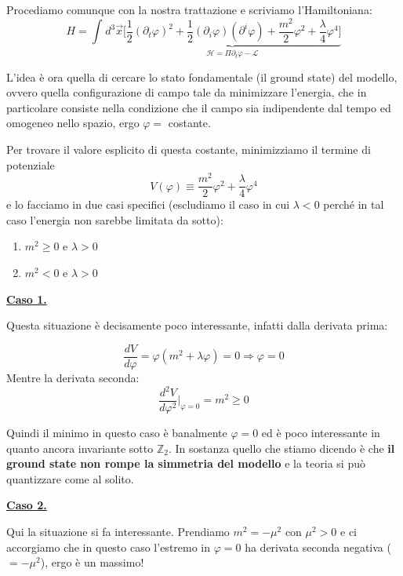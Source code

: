 \documentclass[../main.tex]{subfiles}
\begin{document}
Procediamo comunque con la nostra trattazione e scriviamo l'Hamiltoniana:
\[
H = \int_{}d^3\Vec{x}\underbrace{\bigg[ \frac{1}{2}(\partial_t\varphi)^2 + \frac{1}{2}(\partial_i\varphi)(\partial^i\varphi) + \frac{m^2}{2}\varphi^2  + \frac{\lambda}{4}\varphi^4\bigg]}_{\mathscr{H} = \Pi\partial_t\varphi - \mathscr{L}}
\]

L'idea è ora quella di cercare lo stato fondamentale (il ground state) del modello, ovvero quella configurazione di campo tale da minimizzare l'energia, che in particolare consiste nella condizione che il campo sia indipendente dal tempo ed omogeneo nello spazio, ergo $\varphi = $ costante.

Per trovare il valore esplicito di questa costante, minimizziamo il termine di potenziale
\[
V(\varphi) \equiv \frac{m^2}{2}\varphi^2  + \frac{\lambda}{4}\varphi^4
\]
e lo facciamo in due casi specifici (escludiamo il caso in cui $\lambda<0$ perché in tal caso l'energia non sarebbe limitata da sotto):
\begin{enumerate}
    \item $m^2\geq0$ e $\lambda>0$
    \item $m^2<0$ e $\lambda>0$
\end{enumerate}

\underline{\textbf{Caso 1.}}

Questa situazione è decisamente poco interessante, infatti dalla derivata prima:

\[\frac{dV}{d\varphi} = \varphi(m^2+\lambda\varphi) = 0 \Rightarrow \boxed{\varphi = 0}\]
Mentre la derivata seconda:
\[\frac{d^2V}{d\varphi^2}\bigg|_{\varphi=0} = m^2 \geq 0 \]

Quindi il minimo in questo caso è banalmente $\varphi=0$ ed è poco interessante in quanto ancora invariante sotto $\mathbb{Z}_2$. In sostanza quello che stiamo dicendo è che \textbf{il ground state non rompe la simmetria del modello} e la teoria si può quantizzare come al solito.

\underline{\textbf{Caso 2.}}

Qui la situazione si fa interessante. Prendiamo $m^2 = -\mu^2$ con $\mu^2>0$ e ci accorgiamo che in questo caso l'estremo in $\varphi=0$ ha derivata seconda negativa ($ = -\mu^2$), ergo è un massimo!
\end{document}
